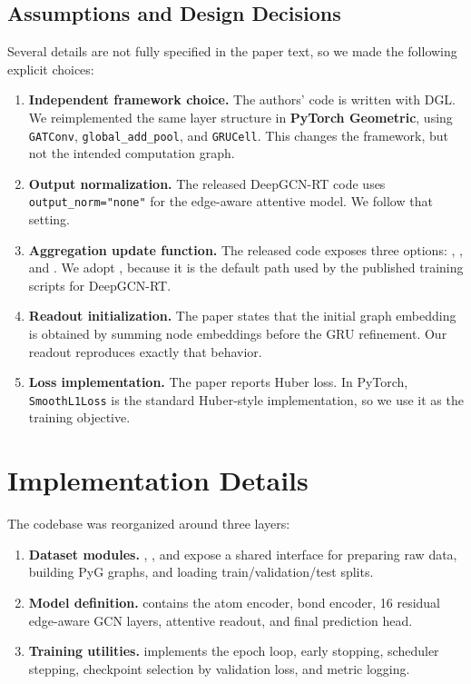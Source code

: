 \subsection{Assumptions and Design Decisions}

Several details are not fully specified in the paper text, so we made the following explicit choices:

\begin{enumerate}
    \item \textbf{Independent framework choice.} The authors' code is written with DGL. We reimplemented the same layer structure in \textbf{PyTorch Geometric}, using \texttt{GATConv}, \texttt{global\_add\_pool}, and \texttt{GRUCell}. This changes the framework, but not the intended computation graph.
    \item \textbf{Output normalization.} The released DeepGCN-RT code uses \texttt{output\_norm="none"} for the edge-aware attentive model. We follow that setting.
    \item \textbf{Aggregation update function.} The released code exposes three options: , , and . We adopt , because it is the default path used by the published training scripts for DeepGCN-RT.
    \item \textbf{Readout initialization.} The paper states that the initial graph embedding is obtained by summing node embeddings before the GRU refinement. Our readout reproduces exactly that behavior.
    \item \textbf{Loss implementation.} The paper reports Huber loss. In PyTorch, \texttt{SmoothL1Loss} is the standard Huber-style implementation, so we use it as the training objective.
\end{enumerate}

\section{Implementation Details}

The codebase was reorganized around three layers:

\begin{enumerate}
    \item \textbf{Dataset modules.} , , and  expose a shared interface for preparing raw data, building PyG graphs, and loading train/validation/test splits.
    \item \textbf{Model definition.}  contains the atom encoder, bond encoder, 16 residual edge-aware GCN layers, attentive readout, and final prediction head.
    \item \textbf{Training utilities.}  implements the epoch loop, early stopping, scheduler stepping, checkpoint selection by validation loss, and metric logging.
\end{enumerate}

